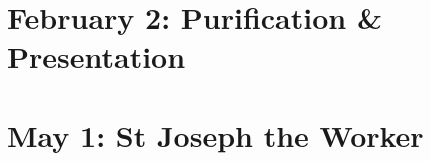{{  \bigskip
  \benedicamusdomino{}
}


{
\section{February 2: Purification \& Presentation}
\subtitle{ Class}
\subtitle{I Vespers}

\subtitle{II Vespers}

\def\definevesperspropers{
  \def\prepsalmfive{\greseteolcustos{manual}}
}
\def\definevesperspropersalt{}
\def\vesperspropersnote{At II Vespers:}
\def\vesperspropersaltnote{At I Vespers:}
\def\premagverses{\greseteolcustos{manual}}
\def\prechapter{\label{purification-chapter}}
\def\printfullhymn{
  {
    \oldneedspace{3\baselineskip}
    \printnote{Hymn. \emph{Ave Maris Stella}, page \pageref{hymn-avemarisstella}.\\}

    \def\vrlinebreak{T}
    \oldneedspace{3\baselineskip}
    \printvr[\greseteolcustos{manual}]{\vrtex}{\vtranslation}{\rtranslation}
  }
}
\bigskip
\benedicamusdomino{}
}

{
\section{May 1: St Joseph the Worker}
\subtitle{ Class}
\subtitle{I \& II Vespers}

\def\definevesperspropers{
  \def\prepsalmfive{\greseteolcustos{manual}}
}
\def\definevesperspropersalt{}
\def\vesperspropersnote{At II Vespers:}
\def\vesperspropersaltnote{At I Vespers:}
\def\premagverses{\greseteolcustos{manual}}

}}
